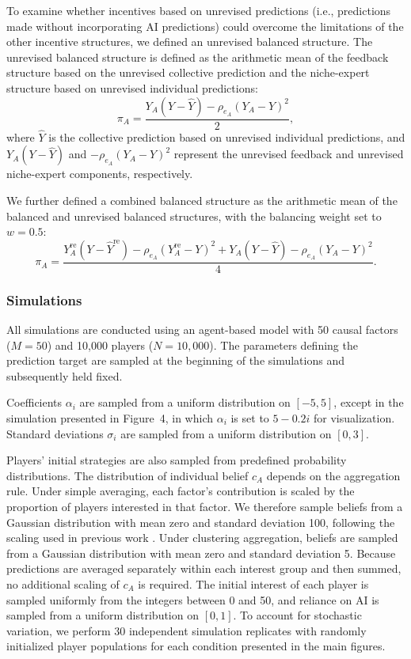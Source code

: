 \documentclass[12pt]{article}
\begin{document}
To examine whether incentives based on unrevised predictions (i.e., predictions made without incorporating AI predictions) could overcome the limitations of the other incentive structures, we defined an unrevised balanced structure. The unrevised balanced structure is defined as the arithmetic mean of the feedback structure based on the unrevised collective prediction and the niche-expert structure based on unrevised individual predictions:
\begin{equation}
\pi_A = \frac{Y_A(Y-\hat{Y}) - \rho_{e_A}(Y_A-Y)^2}{2},
\end{equation}
where $\hat{Y}$ is the collective prediction based on unrevised individual predictions, and $Y_A(Y-\hat{Y})$ and $-\rho_{e_A}(Y_A-Y)^2$ represent the unrevised feedback and unrevised niche-expert components, respectively.

We further defined a combined balanced structure as the arithmetic mean of the balanced and unrevised balanced structures, with the balancing weight set to $w=0.5$:
\begin{equation}
\pi_A = \frac{Y_A^{\mathrm{re}}(Y-\hat{Y}^{\mathrm{re}}) - \rho_{e_A}(Y_A^{\mathrm{re}}-Y)^2 + Y_A(Y-\hat{Y}) - \rho_{e_A}(Y_A-Y)^2}{4}.
\end{equation}

\subsubsection*{Simulations}

All simulations are conducted using an agent-based model with 50 causal factors ($M=50$) and 10,000 players ($N=10{,}000$).
The parameters defining the prediction target are sampled at the beginning of the simulations and subsequently held fixed.

Coefficients $\alpha_i$ are sampled from a uniform distribution on $[-5,5]$, except in the simulation presented in Figure~4, in which $\alpha_i$ is set to $5-0.2i$ for visualization. Standard deviations $\sigma_i$ are sampled from a uniform distribution on $[0,3]$.

Players' initial strategies are also sampled from predefined probability distributions.
The distribution of individual belief $c_A$ depends on the aggregation rule. 
Under simple averaging, each factor's contribution is scaled by the proportion of players interested in that factor. 
We therefore sample beliefs from a Gaussian distribution with mean zero and standard deviation 100, following the scaling used in previous work \citep{wang2025individual}. 
Under clustering aggregation, beliefs are sampled from a Gaussian distribution with mean zero and standard deviation 5. 
Because predictions are averaged separately within each interest group and then summed, no additional scaling of $c_A$ is required. 
The initial interest of each player is sampled uniformly from the integers between 0 and 50, and reliance on AI is sampled from a uniform distribution on $[0,1]$.
To account for stochastic variation, we perform 30 independent simulation replicates with randomly initialized player populations for each condition presented in the main figures.
\end{document}
